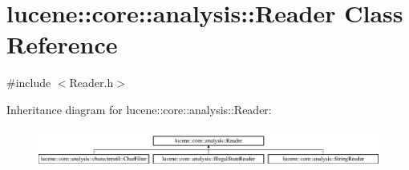 \hypertarget{classlucene_1_1core_1_1analysis_1_1Reader}{}\section{lucene\+:\+:core\+:\+:analysis\+:\+:Reader Class Reference}
\label{classlucene_1_1core_1_1analysis_1_1Reader}


{\ttfamily \#include $<$Reader.\+h$>$}

Inheritance diagram for lucene\+:\+:core\+:\+:analysis\+:\+:Reader\+:\begin{figure}[H]
\begin{center}
\leavevmode
\includegraphics[height=1.323877cm]{classlucene_1_1core_1_1analysis_1_1Reader}
\end{center}
\end{figure}
